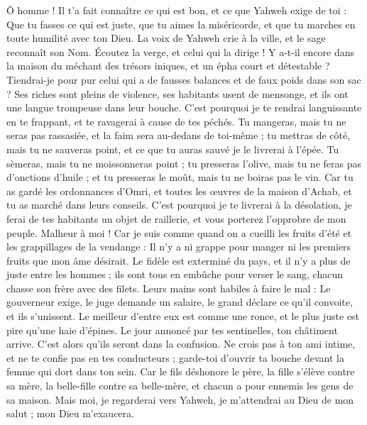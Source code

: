 \begin{multicols}{2}
Ô homme ! Il t'a fait connaître ce qui est bon, et ce que Yahweh exige de toi : Que tu fasses ce qui est juste, que tu aimes la miséricorde, et que tu marches en toute humilité avec ton Dieu.
La voix de Yahweh crie à la ville, et le sage reconnaît son Nom. Écoutez la verge, et celui qui la dirige !
Y a-t-il encore dans la maison du méchant des trésors iniques, et un épha court et détestable ?
Tiendrai-je pour pur celui qui a de fausses balances et de faux poids dans son sac ?
Ses riches sont pleins de violence, ses habitants usent de mensonge, et ils ont une langue trompeuse dans leur bouche.
C'est pourquoi je te rendrai languissante en te frappant, et te ravagerai à cause de tes péchés.
Tu mangeras, mais tu ne seras pas rassasiée, et la faim sera au-dedans de toi-même ; tu mettras de côté, mais tu ne sauveras point, et ce que tu auras sauvé je le livrerai à l'épée.
Tu sèmeras, mais tu ne moissonneras point ; tu presseras l'olive, mais tu ne feras pas d'onctions d'huile ; et tu presseras le moût, mais tu ne boiras pas le vin.
Car tu as gardé les ordonnances d'Omri, et toutes les œuvres de la maison d'Achab, et tu as marché dans leurs conseils. C'est pourquoi je te livrerai à la désolation, je ferai de tes habitants un objet de raillerie, et vous porterez l'opprobre de mon peuple.
\VerseOne{}Malheur à moi ! Car je suis comme quand on a cueilli les fruits d'été et les grappillages de la vendange : Il n'y a ni grappe pour manger ni les premiers fruits que mon âme désirait.
Le fidèle est exterminé du pays, et il n'y a plus de juste entre les hommes ; ils sont tous en embûche pour verser le sang, chacun chasse son frère avec des filets.
Leurs mains sont habiles à faire le mal : Le gouverneur exige, le juge demande un salaire, le grand déclare ce qu'il convoite, et ils s'unissent.
Le meilleur d'entre eux est comme une ronce, et le plus juste est pire qu'une haie d'épines. Le jour annoncé par tes sentinelles, ton châtiment arrive. C'est alors qu'ils seront dans la confusion.
Ne crois pas à ton ami intime, et ne te confie pas en tes conducteurs ; garde-toi d'ouvrir ta bouche devant la femme qui dort dans ton sein.
Car le fils déshonore le père, la fille s'élève contre sa mère, la belle-fille contre sa belle-mère, et chacun a pour ennemis les gens de sa maison.
Mais moi, je regarderai vers Yahweh, je m'attendrai au Dieu de mon salut ; mon Dieu m'exaucera.

\end{multicols}
